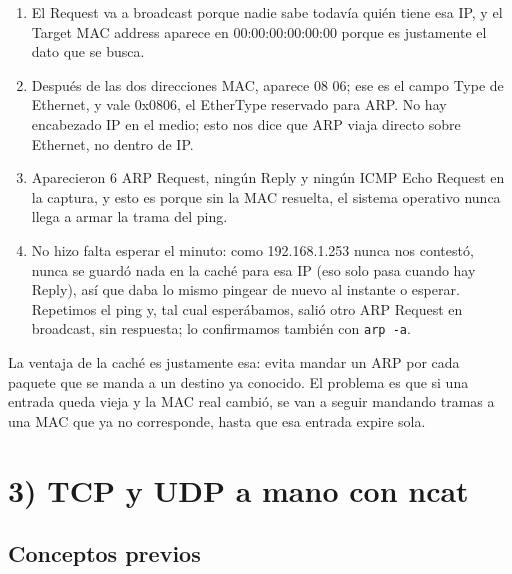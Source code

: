 \documentclass[11pt,a4paper]{article}
\begin{document}
\begin{enumerate}[label=\alph*)]
  \begin{enumerate}[label=\alph*)]
    \item El Request va a broadcast porque nadie sabe todavía quién tiene esa IP, y el Target MAC address aparece en 00:00:00:00:00:00 porque es justamente el dato que se busca.
    \item Después de las dos direcciones MAC, aparece 08 06; ese es el campo Type de Ethernet, y vale 0x0806, el EtherType reservado para ARP. No hay encabezado IP en el medio; esto nos dice que ARP viaja directo sobre Ethernet, no dentro de IP.
    \item Aparecieron 6 ARP Request, ningún Reply y ningún ICMP Echo Request en la captura, y esto es porque sin la MAC resuelta, el sistema operativo nunca llega a armar la trama del ping.
    \item No hizo falta esperar el minuto: como 192.168.1.253 nunca nos contestó, nunca se guardó nada en la caché para esa IP (eso solo pasa cuando hay Reply), así que daba lo mismo pingear de nuevo al instante o esperar. Repetimos el ping y, tal cual esperábamos, salió otro ARP Request en broadcast, sin respuesta; lo confirmamos también con \texttt{arp -a}.
  \end{enumerate}

  La ventaja de la caché es justamente esa: evita mandar un ARP por cada paquete que se manda a un destino ya conocido. El problema es que si una entrada queda vieja y la MAC real cambió, se van a seguir mandando tramas a una MAC que ya no corresponde, hasta que esa entrada expire sola.

\end{enumerate}


\section*{3) TCP y UDP a mano con ncat}

\subsection*{Conceptos previos}
\end{document}
